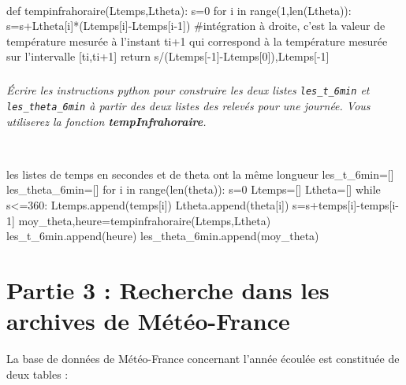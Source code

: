 \documentclass[10pt,fleqn]{article} %
\begin{document}
\ifprof
\begin{corrige}~\
\begin{python}
def tempinfrahoraire(Ltemps,Ltheta):
    s=0
    for i in range(1,len(Ltheta)):
        s=s+Ltheta[i]*(Ltemps[i]-Ltemps[i-1]) #intégration à droite, c'est la valeur de température mesurée à l'instant t{i+1} qui correspond à la température mesurée sur l'intervalle [t{i},t{i+1}]
    return s/(Ltemps[-1]-Ltemps[0]),Ltemps[-1]
\end{python}
\end{corrige}
\else
\fi

\subparagraph{}
\textit{Écrire les instructions python pour construire les deux listes \texttt{les\_t\_6min} et \texttt{les\_theta\_6min} à partir des deux listes des relevés pour une journée. Vous utiliserez la fonction \textbf{tempInfrahoraire}.}

\ifprof
\begin{corrige}~\
\begin{python}
les listes de temps en secondes et de theta ont la même longueur
les_t_6min=[]
les_theta_6min=[]
for i in range(len(theta)):
    s=0
    Ltemps=[]
    Ltheta=[]
    while s<=360:
        Ltemps.append(temps[i])
        Ltheta.append(theta[i])
        s=s+temps[i]-temps[i-1]
    moy_theta,heure=tempinfrahoraire(Ltemps,Ltheta)
    les_t_6min.append(heure)
    les_theta_6min.append(moy_theta)
\end{python}
\end{corrige}
\else
\fi



\section*{Partie 3 : Recherche dans les archives de Météo-France}
La base de données de Météo-France concernant l'année écoulée est 
constituée de deux tables :\\
\end{document}
